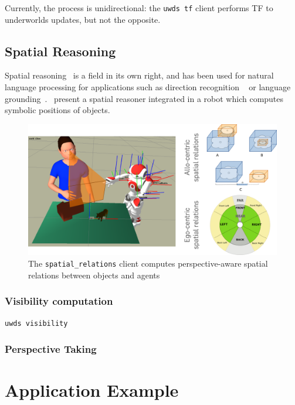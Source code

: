 \documentclass[letterpaper, 10 pt, conference]{ieeeconf}  %
\newcommand{\uwds}{{\sc underworlds}\xspace}
\begin{document}
Currently, the process is unidirectional: the {\tt uwds tf} client performs TF
to \uwds updates, but not the opposite.

\subsection{Spatial Reasoning}

Spatial reasoning~\cite{O'Keefe1999} is a field in its own right, and has been
used for natural language processing for applications such as direction
recognition ~\cite{Kollar2010,Matuszek2010} or language
grounding~\cite{Tellex2010}.~\cite{Skubic2004} present a spatial reasoner
integrated in a robot which computes symbolic positions of objects.

\begin{figure}
    \centering
    \includegraphics[width=0.9\linewidth]{spatialrelations}
    \caption{The {\tt spatial\_relations} client computes perspective-aware
    spatial relations between objects and agents}
    \label{fig|spatialrelations}
\end{figure}

\cite{Ros2010}

\subsubsection{Visibility computation}

{\tt uwds visibility}

\subsubsection{Perspective Taking}


\section{Application Example}
\end{document}
